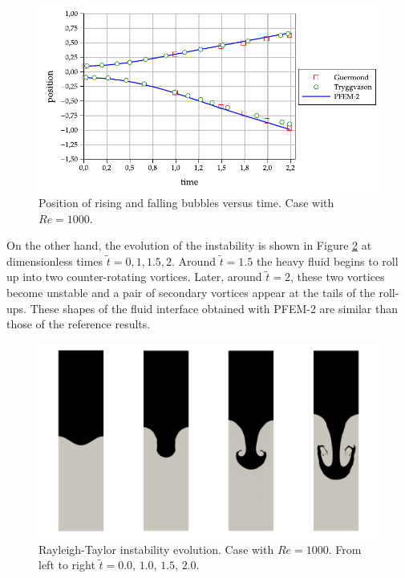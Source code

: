 \documentclass[a4paper,conference]{IEEEtran}
\begin{document}
\begin{figure}[H]
  \begin{center}
      \includegraphics[width=\columnwidth]{images/rayleigh_1.pdf}
  \end{center}
  \caption{\label{fg:rayleigh-rf} Position of rising and falling bubbles versus time. Case with $Re=1000$.}
\end{figure}

On the other hand, the evolution of the instability is shown in Figure \ref{fg:rayleigh-screenshots} at dimensionless times $\widetilde{t}=0, 1, 1.5, 2$. Around $\widetilde{t}=1.5$ the heavy fluid begins to roll up into two counter-rotating vortices. Later, around $\widetilde{t} = 2$, these two vortices become unstable and a pair of secondary vortices appear at the tails of the roll-ups. These shapes of the fluid interface obtained with PFEM-2 are similar than those of the reference results.


\begin{figure}[htbp]
  \begin{center}
      \includegraphics[width=\columnwidth]{images/rayleigh_2.jpg}
  \end{center}
  \caption{\label{fg:rayleigh-screenshots} Rayleigh-Taylor instability evolution. Case with $Re=1000$. From left to right $\widetilde{t} =0.0$, $1.0$, $1.5$, $2.0$.}
\end{figure}
\afterpage{\clearpage}
\end{document}
